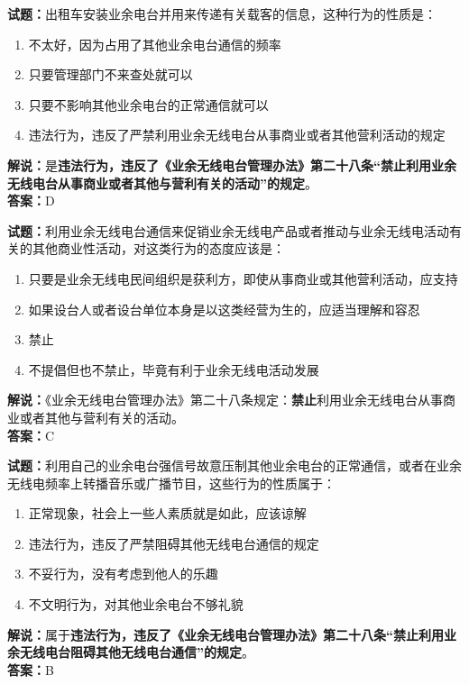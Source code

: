 \documentclass{ctexbook}
\begin{document}
\bigskip


\noindent\textbf{试题：}出租车安装业余电台并用来传递有关载客的信息，这种行为的性质是：
\begin{enumerate}[leftmargin=3em]
	\item 不太好，因为占用了其他业余电台通信的频率
	\item 只要管理部门不来查处就可以
	\item 只要不影响其他业余电台的正常通信就可以
	\item 违法行为，违反了严禁利用业余无线电台从事商业或者其他营利活动的规定%
\end{enumerate}
\noindent\textbf{解说：}是\textbf{违法行为，违反了《业余无线电台管理办法》第二十八条“禁止利用业余无线电台从事商业或者其他与营利有关的活动”的规定}。\\\noindent\textbf{答案：}D



\bigskip


\noindent\textbf{试题：}利用业余无线电台通信来促销业余无线电产品或者推动与业余无线电活动有关的其他商业性活动，对这类行为的态度应该是：
\begin{enumerate}[leftmargin=3em]
	\item 只要是业余无线电民间组织是获利方，即使从事商业或其他营利活动，应支持
	\item 如果设台人或者设台单位本身是以这类经营为生的，应适当理解和容忍
	\item 禁止
	\item 不提倡但也不禁止，毕竟有利于业余无线电活动发展
\end{enumerate}
\noindent\textbf{解说：}《业余无线电台管理办法》第二十八条规定：\textbf{禁止}利用业余无线电台从事商业或者其他与营利有关的活动。\\\noindent\textbf{答案：}C




\bigskip


\noindent\textbf{试题：}利用自己的业余电台强信号故意压制其他业余电台的正常通信，或者在业余无线电频率上转播音乐或广播节目，这些行为的性质属于：
\begin{enumerate}[leftmargin=3em]
	\item 正常现象，社会上一些人素质就是如此，应该谅解
	\item 违法行为，违反了严禁阻碍其他无线电台通信的规定
	\item 不妥行为，没有考虑到他人的乐趣
	\item 不文明行为，对其他业余电台不够礼貌
\end{enumerate}
\noindent\textbf{解说：}属于\textbf{违法行为，违反了《业余无线电台管理办法》第二十八条“禁止利用业余无线电台阻碍其他无线电台通信”的规定}。\\\noindent\textbf{答案：}B
\end{document}
